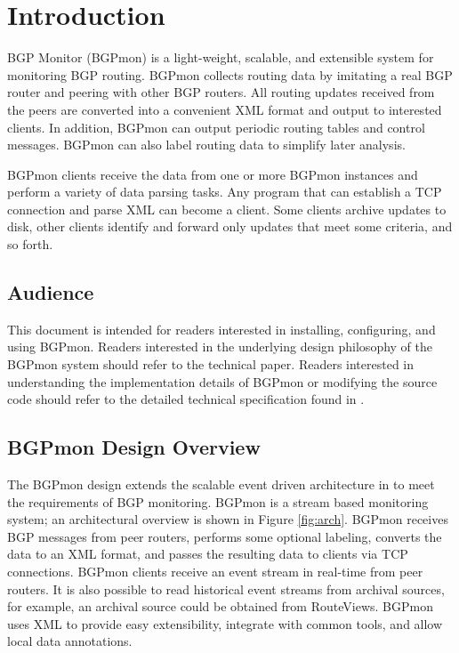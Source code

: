 \section{Introduction}
\label{sec:intro}

BGP Monitor (BGPmon) is a light-weight, scalable,  and extensible system for monitoring BGP routing.
BGPmon collects routing data by imitating a real BGP router and peering with other BGP routers.
All routing updates received from the peers are converted into a convenient XML format and output to interested clients.
In addition, BGPmon can output periodic routing tables and control messages.
BGPmon can also label routing data to simplify later analysis.   

BGPmon clients receive the data from one or more BGPmon instances and perform a variety of data parsing tasks.
Any program that can establish a TCP connection and parse XML can become a client.
Some clients archive updates to disk,  other clients identify and forward only updates that meet some criteria, and so forth.

\subsection{Audience}

This document is intended for readers interested in installing, configuring, and using BGPmon.
Readers interested in the underlying design philosophy of the BGPmon system should refer to the technical paper\cite{imc08}.
Readers interested in understanding the implementation details of BGPmon or modifying the source code should refer to the detailed technical specification found in \cite{massey08tech}.     

\subsection{BGPmon Design Overview}

The BGPmon design extends the scalable event driven architecture in \cite{seda} to meet the requirements of BGP monitoring.
BGPmon is a stream based monitoring system; an architectural overview is shown in Figure \ref{fig:arch}.
BGPmon receives BGP messages from peer routers, performs some optional labeling, converts the data to an XML format, and passes the resulting data to clients via TCP connections.
BGPmon clients receive an event stream in real-time from peer routers. 
It is also possible to read historical event streams from archival sources, for example, an archival source could be obtained from RouteViews.
BGPmon uses XML to provide easy extensibility, integrate with common tools, and allow local data annotations.      

